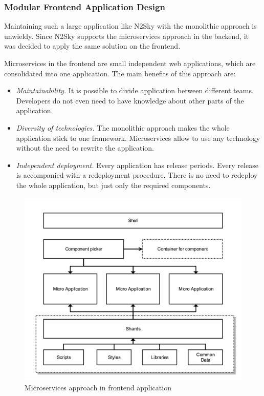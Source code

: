  
 
\subsubsection{Modular Frontend Application Design}\label{Modular frontend application design}

Maintaining such a large application like N2Sky with the monolithic approach is unwieldy. Since N2Sky supports the microservices approach in the backend, it was decided to apply the same solution on the frontend.  

Microservices in the frontend are small independent web applications, which are consolidated into one application. The main benefits of this approach are:

\begin{itemize}
\item \emph{Maintainability.} It is possible to divide application between different teams. Developers do not even need to have knowledge about other parts of the application. 
\item \emph{Diversity of technologies.} The monolithic approach makes the whole application stick to one framework. Microservices allow to use any technology without the need to rewrite the application.
\item \emph{Independent deployment.} Every application has release periods. Every release is accompanied with a redeployment procedure. There is no need to redeploy the whole application, but just only the required components.
\end{itemize}


\begin{figure}[H]
\begin{center}
  \includegraphics[width=\linewidth]{components/2/frontend_arch.png}
  \caption{Microservices approach in frontend application}
  \label{fig:frontend_arch}
\end{center}
\end{figure}


